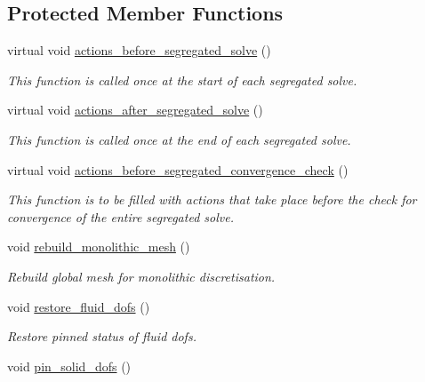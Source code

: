 \subsection*{Protected Member Functions}
\begin{DoxyCompactItemize}
\item 
virtual void \hyperlink{classoomph_1_1SegregatableFSIProblem_ae8c920185dc95ab3be243276fd4253b0}{actions\+\_\+before\+\_\+segregated\+\_\+solve} ()
\begin{DoxyCompactList}\small\item\em This function is called once at the start of each segregated solve. \end{DoxyCompactList}\item 
virtual void \hyperlink{classoomph_1_1SegregatableFSIProblem_a284fb37276735a73bca0467fa2e44909}{actions\+\_\+after\+\_\+segregated\+\_\+solve} ()
\begin{DoxyCompactList}\small\item\em This function is called once at the end of each segregated solve. \end{DoxyCompactList}\item 
virtual void \hyperlink{classoomph_1_1SegregatableFSIProblem_abc1e909975df69e27f8f1435e215a842}{actions\+\_\+before\+\_\+segregated\+\_\+convergence\+\_\+check} ()
\begin{DoxyCompactList}\small\item\em This function is to be filled with actions that take place before the check for convergence of the entire segregated solve. \end{DoxyCompactList}\item 
void \hyperlink{classoomph_1_1SegregatableFSIProblem_a61cad9a0a75f2999c0529caa9cac2b73}{rebuild\+\_\+monolithic\+\_\+mesh} ()
\begin{DoxyCompactList}\small\item\em Rebuild global mesh for monolithic discretisation. \end{DoxyCompactList}\item 
void \hyperlink{classoomph_1_1SegregatableFSIProblem_abbf4987f2891218d8efcf53de6150425}{restore\+\_\+fluid\+\_\+dofs} ()
\begin{DoxyCompactList}\small\item\em Restore pinned status of fluid dofs. \end{DoxyCompactList}\item 
void \hyperlink{classoomph_1_1SegregatableFSIProblem_acf28573efb54e2b33101ba8cb503a5b8}{pin\+\_\+solid\+\_\+dofs} ()

\end{DoxyCompactItemize}

